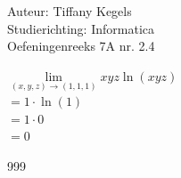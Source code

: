 \documentclass[a4paper]{article}
\begin{document}
  
\noindent \large Auteur: Tiffany Kegels \\
\noindent \large Studierichting: Informatica\\
\noindent \large Oefeningenreeks 7A nr. 2.4\\

\medskip

\normalsize

$\lim\limits_{(x,y,z)\rightarrow(1,1,1)} xyz\ln(xyz)$\\

$=1\cdot \ln(1)$\\

$=1\cdot0$\\

$=0$

\begin{thebibliography}{999}

\end{thebibliography}
\end{document}
